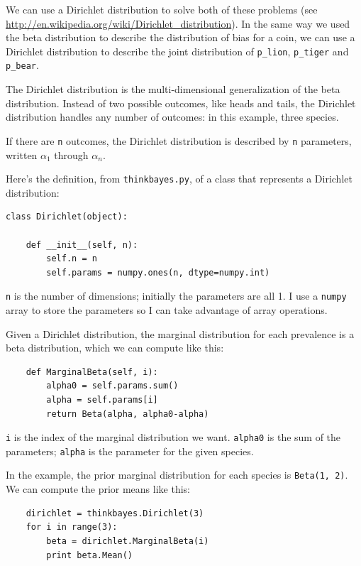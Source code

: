 \documentclass[12pt]{book}
\begin{document}
We can use a Dirichlet distribution to solve both of these problems
(see \url{http://en.wikipedia.org/wiki/Dirichlet_distribution}).  In
the same way we used the beta distribution to describe the
distribution of bias for a coin, we can use a Dirichlet
distribution to describe the joint distribution of \verb"p_lion",
\verb"p_tiger" and \verb"p_bear".

The Dirichlet distribution is the multi-dimensional generalization
of the beta distribution.  Instead of two possible outcomes, like
heads and tails, the Dirichlet distribution handles any number of
outcomes: in this example, three species.

If there are {\tt n} outcomes, the Dirichlet distribution is
described by {\tt n} parameters, written $\alpha_1$ through $\alpha_n$.

Here's the definition, from {\tt thinkbayes.py}, of a class that
represents a Dirichlet distribution:

\begin{verbatim}
class Dirichlet(object):

    def __init__(self, n):
        self.n = n
        self.params = numpy.ones(n, dtype=numpy.int)
\end{verbatim}

{\tt n} is the number of dimensions; initially the parameters
are all 1.  I use a {\tt numpy} array to store the parameters
so I can take advantage of array operations.

Given a Dirichlet distribution, the marginal distribution
for each prevalence is a beta distribution, which we can
compute like this:

\begin{verbatim}
    def MarginalBeta(self, i):
        alpha0 = self.params.sum()
        alpha = self.params[i]
        return Beta(alpha, alpha0-alpha)
\end{verbatim}

{\tt i} is the index of the marginal distribution we want.
{\tt alpha0} is the sum of the parameters; {\tt alpha} is the
parameter for the given species.

In the example, the prior marginal distribution for each species
is {\tt Beta(1, 2)}.  We can compute the prior means like
this:

\begin{verbatim}
    dirichlet = thinkbayes.Dirichlet(3)
    for i in range(3):
        beta = dirichlet.MarginalBeta(i)
        print beta.Mean()
\end{verbatim}
\end{document}
